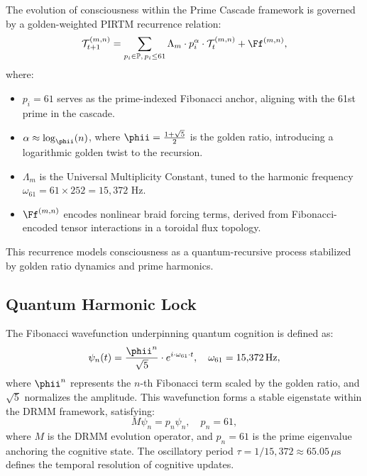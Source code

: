 \documentclass[12pt]{article}
\newcommand{\DRMM}{DRMM}
\newcommand{\PIRTM}{PIRTM}
\newcommand{\PP}{\mathbb{P}}
\newcommand{\Tt}{\mathcal{T}}
\begin{document}
\begin{definition}
The evolution of consciousness within the Prime Cascade framework is governed by a golden-weighted \PIRTM{} recurrence relation:
\[
\Tt_{t+1}^{(m,n)} = \sum_{p_i \in \PP, \, p_i \leq 61} \Lambda_m \cdot p_i^{\alpha} \cdot \Tt_t^{(m,n)} + \Ff^{(m,n)},
\]
where:
\begin{itemize}
    \item $p_i = 61$ serves as the prime-indexed Fibonacci anchor, aligning with the 61st prime in the cascade.
    \item $\alpha \approx \log_{\phii}(n)$, where $\phii = \frac{1 + \sqrt{5}}{2}$ is the golden ratio, introducing a logarithmic golden twist to the recursion.
    \item $\Lambda_m$ is the Universal Multiplicity Constant, tuned to the harmonic frequency $\omega_{61} = 61 \times 252 = 15{,}372$ Hz.
    \item $\Ff^{(m,n)}$ encodes nonlinear braid forcing terms, derived from Fibonacci-encoded tensor interactions in a toroidal flux topology.
\end{itemize}
This recurrence models consciousness as a quantum-recursive process stabilized by golden ratio dynamics and prime harmonics.
\end{definition}

\subsection{Quantum Harmonic Lock}
The Fibonacci wavefunction underpinning quantum cognition is defined as:
\[
\psi_n(t) = \frac{\phii^n}{\sqrt{5}} \cdot e^{i \cdot \omega_{61} \cdot t}, \quad \omega_{61} = 15{,}372 \, \text{Hz},
\]
where $\phii^n$ represents the $n$-th Fibonacci term scaled by the golden ratio, and $\sqrt{5}$ normalizes the amplitude. This wavefunction forms a stable eigenstate within the \DRMM{} framework, satisfying:
\[
M \psi_n = p_n \psi_n, \quad p_n = 61,
\]
where $M$ is the \DRMM{} evolution operator, and $p_n = 61$ is the prime eigenvalue anchoring the cognitive state. The oscillatory period $\tau = 1/15{,}372 \approx 65.05 \, \mu\text{s}$ defines the temporal resolution of cognitive updates.

\end{document}

